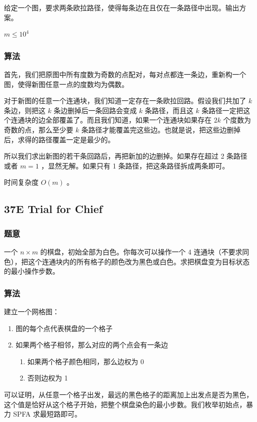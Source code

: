 \documentclass[11pt]{article}
\begin{document}
    给定一个图，要求两条欧拉路径，使得每条边在且仅在一条路径中出现。输出方案。

    $m \leq 10^4$
\subsubsection{算法}
\label{sec-2-8-2}

    首先，我们把原图中所有度数为奇数的点配对，每对点都连一条边，重新构一个图，使得新图任意一点的度数均为偶数。

    对于新图的任意一个连通块，我们知道一定存在一条欧拉回路。假设我们共加了 $k$ 条边，则把这 $k$ 条边删掉后一条回路会变成 $k$ 条路径，而且这 $k$ 条路径一定把这个连通块的边全部覆盖了。而且我们知道，如果一个连通块如果存在 $2k$ 个度数为奇数的点，那么至少要 $k$ 条路径才能覆盖完这些边。也就是说，把这些边删掉后，求得的路径覆盖一定是最少的。

    所以我们求出新图的若干条回路后，再把新加的边删掉。如果存在超过 2 条路径或者 $m = 1$ ，显然无解。如果只有 1 条路径，把这条路径拆成两条即可。

    时间复杂度 $O(m)$ 。
\subsection{37E   Trial for Chief}
\label{sec-2-9}
\subsubsection{题意}
\label{sec-2-9-1}

    一个 $n \times m$ 的棋盘，初始全部为白色。你每次可以操作一个 4 连通块（不要求同色），把这个连通块内的所有格子的颜色改为黑色或白色。求把棋盘变为目标状态的最小操作步数。
\subsubsection{算法}
\label{sec-2-9-2}

    建立一个网格图：
\begin{enumerate}
\item 图的每个点代表棋盘的一个格子
\item 如果两个格子相邻，那么对应的两个点会有一条边
\begin{enumerate}
\item 如果两个格子颜色相同，那么边权为 0
\item 否则边权为 1
\end{enumerate}
\end{enumerate}

    可以证明，从任意一个格子出发，最远的黑色格子的距离加上出发点是否为黑色，这个值是恰好从这个格子开始，把整个棋盘染色的最小步数。我们枚举初始点，暴力 SPFA 求最短路即可。
\end{document}
